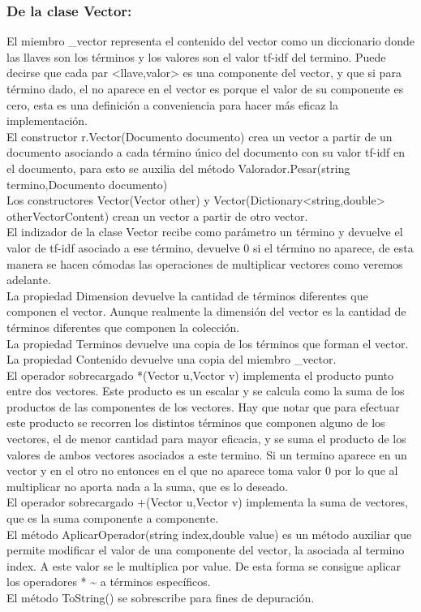 \documentclass{article}
\begin{document}
\subsubsection{De la clase Vector:}
El miembro \_vector representa el contenido del vector como un diccionario donde las llaves son los términos y los valores son el valor tf-idf del termino. Puede decirse que cada par <llave,valor> es una componente del vector, y que si para término dado, el no aparece en el vector es porque el valor de su componente es cero, esta es una definición a conveniencia para hacer más eficaz la implementación.\\
El constructor r.Vector(Documento documento) crea un vector a partir de un documento asociando a cada término único del documento con su valor tf-idf en el documento, para esto se auxilia del método Valorador.Pesar(string termino,Documento documento)\\
Los constructores Vector(Vector other) y Vector(Dictionary<string,double> otherVectorContent)  crean un vector a partir de otro vector.\\
El indizador de la clase Vector recibe como parámetro un término y devuelve el valor de tf-idf asociado a ese término, devuelve 0 si el término no aparece, de esta manera se hacen cómodas las operaciones de multiplicar vectores como veremos adelante.\\
La propiedad Dimension devuelve la cantidad de términos diferentes que componen el vector. Aunque realmente la dimensión del vector es la cantidad de términos diferentes que componen la colección.\\
La propiedad Terminos devuelve una copia de los términos que forman el vector.\\
La propiedad Contenido devuelve una copia del miembro \_vector.\\
El operador sobrecargado *(Vector u,Vector v) implementa el producto punto entre dos vectores. Este producto es un escalar y se calcula como la suma de los productos de las componentes de los vectores. Hay que notar que para efectuar este producto se recorren los distintos términos que componen alguno de los vectores, el de menor cantidad para mayor eficacia, y se suma el producto de los valores de ambos vectores asociados a este termino. Si un termino aparece en un vector y en el otro no entonces en el que no aparece toma valor 0 por lo que al multiplicar no aporta nada a la suma, que es lo deseado.\\
El operador sobrecargado +(Vector u,Vector v) implementa la suma de vectores, que es la suma componente a componente.\\
El método AplicarOperador(string index,double value) es un método auxiliar que permite modificar el valor de una componente del vector, la asociada al termino index. A este valor se le multiplica por value. De esta forma se consigue aplicar los operadores * \~{} a términos específicos.\\
El método ToString() se sobrescribe para fines de depuración.\\
\end{document}
